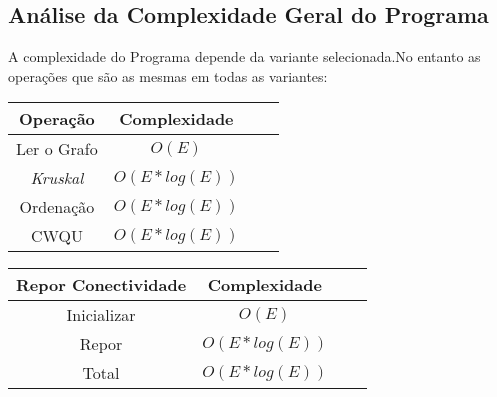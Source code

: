 \documentclass[14pt]{article}
\begin{document}
    \subsection[gencomplexity]{Análise da Complexidade Geral do Programa}
    A complexidade do Programa depende da variante selecionada.No entanto as operações que são as mesmas em todas as variantes:
    \FloatBarrier
    \begin{table}[H]
        \centering
        \begin{tabular}{|| c || c || c || c ||}
            \hline
            Operação & Complexidade\\ [0.5ex]
            \hline\hline
            Ler o Grafo & \(O(E)\) \\
            \emph{Kruskal} &\(O(E*log(E))\) \\
            Ordenação & \(O(E*log(E))\) \\
            CWQU & \(O(E*log(E))\)\\
            \hline\hline
        \end{tabular}
        \quad
        \begin{tabular}{|| c || c || c || c ||}
            \hline
            Repor Conectividade & Complexidade\\ [0.5ex]
            \hline\hline
            Inicializar & \(O(E)\)\\
            Repor & \(O(E*log(E))\) \\
            Total & \(O(E*log(E))\)\\
            \hline\hline
        \end{tabular}\\
    \end{table}
\end{document}
